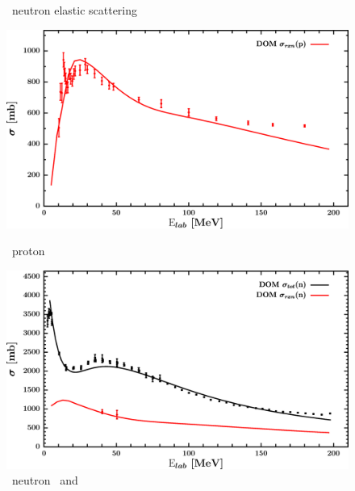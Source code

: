 \begin{figure}[hbtp]
\begin{minipage}{0.47\textwidth}
        \caption*{\caForty\ neutron elastic scattering}
        \label{DOMFitData_ca40_neutron_elastic}
    \end{minipage}
\end{figure}
\vspace{0.70in}
\begin{figure}[hbtp]
    \centering
    \begin{minipage}{0.47\textwidth}
        \centering
        \includegraphics[width=\linewidth]{figures/ca40_protonInelastic.png}
        \caption*{\caForty\ proton \rxn}
        \label{DOMFitData_ca40_proton_inelastic}
    \end{minipage}\hspace{6pt}
    \begin{minipage}{0.47\textwidth}
        \centering
        \includegraphics[width=\textwidth]{figures/ca40_neutronInelastic.png}
        \caption*{\caForty\ neutron \rxn\ and \tot}
        \label{DOMFitData_ca40_neutron_inelastic}
    \end{minipage}
\end{figure}
\afterpage{\clearpage}
